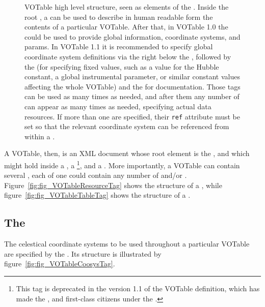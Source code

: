 \begin{figure}[tbp]
	\caption[Elements of the ]
	{
		VOTable high level structure, seen as elements of the
        . Inside the root , a
         can be used to describe in human readable
        form the contents of a particular VOTable. After that, in
        VOTable 1.0 the  could be used to provide
        global information, coordinate systems, and params. In VOTable
        1.1 it is recommended to specify global coordinate system
        definitions via the  right below the
        , followed by the  (for specifying
        fixed values, such as a value for the Hubble constant, a global
        instrumental parameter, or similar constant values affecting the
        whole VOTable) and the  for documentation. Those
        tags can be used as many times as needed, and after them any
        number of  can appear as many times as needed,
        specifying actual data resources. If more than one
         are specified, their \texttt{ref} attribute
        must be set so that the relevant coordinate system can be
        referenced from within a .
		\oxygenxml
	}
	\label{fig:fig_VOTable11}
\end{figure}


A VOTable, then, is an XML document whose root element is the
, and which might hold inside a , a
\footnote{This tag is deprecated in the version 1.1
of the VOTable definition, which has made the ,
 and  first-class citizens under the
.}, and a . More importantly, a VOTable
can contain several , each of one could contain any
number of  and/or .
Figure~\ref{fig:fig_VOTableResourceTag} shows the structure of a
, while figure~\ref{fig:fig_VOTableTableTag} shows the
structure of a .

\subsection{The } %
\label{sub:the_coosys_tag}

The celestical coordinate systems to be used throughout a particular
VOTable are specified by the . Its structure is
illustrated by figure~\ref{fig:fig_VOTableCoosysTag}.

